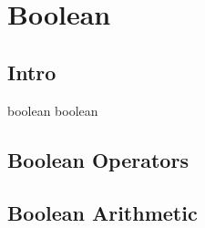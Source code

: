 \chapter{Boolean}

\section{Intro}

boolean boolean

\section{Boolean Operators}

\section{Boolean Arithmetic}